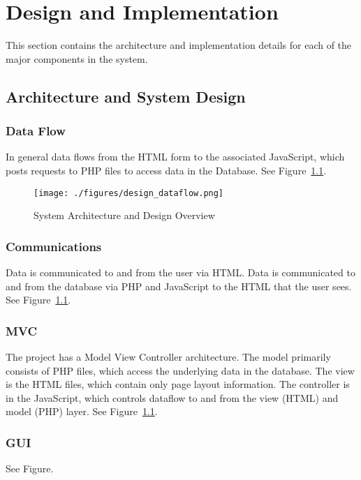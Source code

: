 

\chapter{Design  and Implementation}
This section contains the architecture and implementation details for each of the major components in the system.

 \section{Architecture and System Design}
 
 \subsection{Data Flow} 
 In general data flows from the HTML form to the associated JavaScript, which posts requests to PHP files to access data in the Database. See Figure~\ref{design_dataflow}.

\begin{figure}[tbh]
\begin{center}
\texttt{[image: ./figures/design\_dataflow.png]}
\end{center}
\caption{System Architecture and Design Overview\label{design_dataflow}}
\end{figure}
 
 \subsection{Communications} Data is communicated to and from the user via HTML. Data is communicated to and from the database via PHP and JavaScript to the HTML that the user sees. See Figure~\ref{design_dataflow}.
 
 \subsection{MVC} The project has a Model View Controller architecture. The model primarily consists of PHP files, which access the underlying data in the database. The view is the HTML files, which contain only page layout information. The controller is in the JavaScript, which controls dataflow to and from the view (HTML) and model (PHP) layer. See Figure~\ref{design_dataflow}.
 
 \subsection{GUI} See Figure.
 
